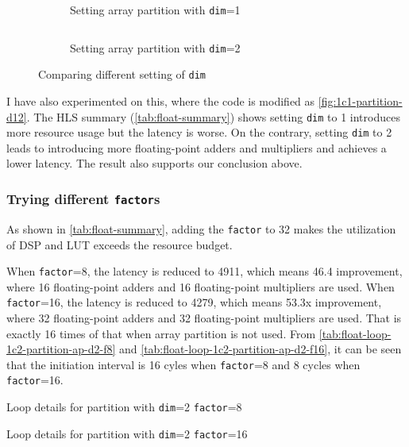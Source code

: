 \begin{figure}[ht!]
    \begin{subfigure}[b]{\textwidth}
        \inputminted[firstline=3]{diff}{program/1c1-partition-ap-d1-f2.diff}
        \caption{Setting array partition with \texttt{dim}=1}
        \label{fig:1c1-partition-ap-d1-f2.diff}
    \end{subfigure}
    \begin{subfigure}[b]{\textwidth}
        \inputminted[firstline=3]{diff}{program/1c1-partition-ap-d2-f2.diff}
        \caption{Setting array partition with \texttt{dim}=2}
        \label{fig:1c1-partition-ap-d2-f2.diff}
    \end{subfigure}
    \caption{Comparing different setting of \texttt{dim}}\label{fig:1c1-partition-d12}
\end{figure}

I have also experimented on this, where the code is modified as \autoref{fig:1c1-partition-d12}.
The HLS summary (\autoref{tab:float-summary}) shows setting \texttt{dim} to 1 introduces more resource usage but the latency is worse.
On the contrary, setting \texttt{dim} to 2 leads to introducing more floating-point adders and multipliers and achieves a lower latency.
The result also supports our conclusion above.

\subsubsection{Trying different \texttt{factor}s}\label{sec:1cFac}

As shown in \autoref{tab:float-summary}, adding the \texttt{factor} to 32 makes the utilization of DSP and LUT exceeds the resource budget.

When \texttt{factor}=8, the latency is reduced to 4911, which means 46.4 improvement, where 16 floating-point adders and 16 floating-point multipliers are used.
When \texttt{factor}=16, the latency is reduced to 4279, which means 53.3x improvement, where 32 floating-point adders and 32 floating-point multipliers are used.
That is exactly 16 times of that when array partition is not used.
From \autoref{tab:float-loop-1c2-partition-ap-d2-f8} and \autoref{tab:float-loop-1c2-partition-ap-d2-f16}, it can be seen that the initiation interval is 16 cyles when \texttt{factor}=8 and 8 cycles when \texttt{factor}=16.

\begin{table}[ht!]
    \caption{Loop details for partition with \texttt{dim}=2 \texttt{factor}=8}
    \label{tab:float-loop-1c2-partition-ap-d2-f8}
    \centering
    
\end{table}

\begin{table}[ht!]
    \caption{Loop details for partition with \texttt{dim}=2 \texttt{factor}=16}
    \label{tab:float-loop-1c2-partition-ap-d2-f16}
    \centering
    
\end{table}
